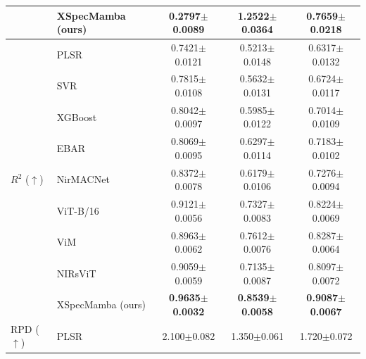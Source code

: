 \documentclass[pdflatex,sn-mathphys-num]{sn-jnl}%
\begin{document}
\begin{table}
\begin{tabular*}{\textheight}{@{\extracolsep\fill}llccc}
& XSpecMamba (ours)
& \textbf{0.2797{\scriptsize$\pm$0.0089}}
& \textbf{1.2522{\scriptsize$\pm$0.0364}}
& \textbf{0.7659{\scriptsize$\pm$0.0218}} \\

\midrule

\multirow{9}{*}{$R^2$ ($\uparrow$)}

& PLSR
& 0.7421{\scriptsize$\pm$0.0121}
& 0.5213{\scriptsize$\pm$0.0148}
& 0.6317{\scriptsize$\pm$0.0132} \\

& SVR
& 0.7815{\scriptsize$\pm$0.0108}
& 0.5632{\scriptsize$\pm$0.0131}
& 0.6724{\scriptsize$\pm$0.0117} \\

& XGBoost
& 0.8042{\scriptsize$\pm$0.0097}
& 0.5985{\scriptsize$\pm$0.0122}
& 0.7014{\scriptsize$\pm$0.0109} \\

& EBAR \cite{phan2025ebar}
& 0.8069{\scriptsize$\pm$0.0095}
& 0.6297{\scriptsize$\pm$0.0114}
& 0.7183{\scriptsize$\pm$0.0102} \\

\cmidrule(lr){2-5}

& NirMACNet \cite{phuong2025nirmacnet}
& 0.8372{\scriptsize$\pm$0.0078}
& 0.6179{\scriptsize$\pm$0.0106}
& 0.7276{\scriptsize$\pm$0.0094} \\

& ViT-B/16 \cite{dosovitskiy2021image}
& 0.9121{\scriptsize$\pm$0.0056}
& 0.7327{\scriptsize$\pm$0.0083}
& 0.8224{\scriptsize$\pm$0.0069} \\

& ViM \cite{zhu2024vision}
& 0.8963{\scriptsize$\pm$0.0062}
& 0.7612{\scriptsize$\pm$0.0076}
& 0.8287{\scriptsize$\pm$0.0064} \\

& NIRsViT \cite{van2024nirsvit}
& 0.9059{\scriptsize$\pm$0.0059}
& 0.7135{\scriptsize$\pm$0.0087}
& 0.8097{\scriptsize$\pm$0.0072} \\

& XSpecMamba (ours)
& \textbf{0.9635{\scriptsize$\pm$0.0032}}
& \textbf{0.8539{\scriptsize$\pm$0.0058}}
& \textbf{0.9087{\scriptsize$\pm$0.0067}} \\

\midrule

\multirow{9}{*}{RPD ($\uparrow$)}

& PLSR
& 2.100{\scriptsize$\pm$0.082}
& 1.350{\scriptsize$\pm$0.061}
& 1.720{\scriptsize$\pm$0.072} \\


\end{tabular*}
\end{table}
\end{document}
